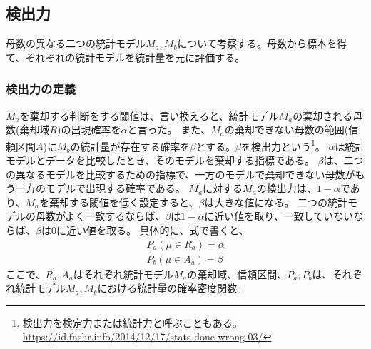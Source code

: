 \subsection{検出力}
母数の異なる二つの統計モデル$M_a,M_b$について考察する。母数から標本を得て、それぞれの統計モデルを統計量を元に評価する。
\subsubsection{検出力の定義}
$M_a$を棄却する判断をする閾値は、言い換えると、統計モデル$M_a$の棄却される母数(棄却域$R$)の出現確率を$\alpha$と言った。
また、$M_a$の棄却できない母数の範囲(信頼区間$A$)に$M_b$の統計量が存在する確率を$\beta$とする。$\beta$を検出力という\footnote{検出力を検定力または統計力と呼ぶこともある。\url{https://id.fnshr.info/2014/12/17/stats-done-wrong-03/}}。
$\alpha$は統計モデルとデータを比較したとき、そのモデルを棄却する指標である。
$\beta$は、二つの異なるモデルを比較するための指標で、一方のモデルで棄却できない母数がもう一方のモデルで出現する確率である。
$M_a$に対する$M_a$の検出力は、$1-\alpha$であり、$M_a$を棄却する閾値を低く設定すると、$\beta$は大きな値になる。
二つの統計モデルの母数がよく一致するならば、$\beta$は$1-\alpha$に近い値を取り、一致していないならば、$\beta$は0に近い値を取る。
具体的に、式で書くと、
\begin{eqnarray*}
    P_a(\mu \in R_a) = \alpha\\
    P_b(\mu \in A_a) = \beta
\end{eqnarray*}
ここで、$R_a,A_a$はそれぞれ統計モデル$M_a$の棄却域、信頼区間、$P_a,P_b$は、それぞれ統計モデル$M_a,M_b$における統計量の確率密度関数。

